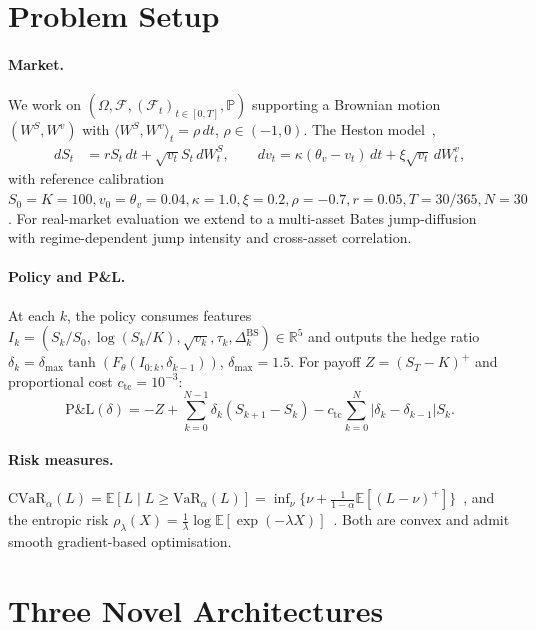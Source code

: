 \documentclass[11pt]{article}
\newcommand{\cvar}{\mathrm{CVaR}}
\newcommand{\E}{\mathbb{E}}
\newcommand{\PP}{\mathbb{P}}
\newcommand{\R}{\mathbb{R}}
\begin{document}
\section{Problem Setup}\label{sec:setup}

\paragraph{Market.}  We work on $(\Omega,\mathcal{F},(\mathcal{F}_t)_{t\in[0,T]},\PP)$ supporting a Brownian motion $(W^S, W^v)$ with $\langle W^S, W^v\rangle_t = \rho\,dt$, $\rho\in(-1,0)$.  The Heston model~\citep{heston1993closed},
\begin{align}
dS_t &= rS_t\,dt + \sqrt{v_t}S_t\,dW_t^S, \qquad
dv_t = \kappa(\theta_v - v_t)\,dt + \xi\sqrt{v_t}\,dW_t^v,
\end{align}
with reference calibration $S_0=K=100, v_0=\theta_v=0.04, \kappa=1.0, \xi=0.2, \rho=-0.7, r=0.05, T=30/365, N=30$.  For real-market evaluation we extend to a multi-asset Bates jump-diffusion~\citep{bates1996jumps} with regime-dependent jump intensity and cross-asset correlation.

\paragraph{Policy and P\&L.}
At each $k$, the policy consumes features $I_k=(S_k/S_0,\log(S_k/K),\sqrt{v_k},\tau_k,\Delta_k^{\mathrm{BS}})\in\R^5$ and outputs the hedge ratio $\delta_k=\delta_{\max}\tanh(F_\theta(I_{0:k},\delta_{k-1}))$, $\delta_{\max}=1.5$.  For payoff $Z=(S_T-K)^+$ and proportional cost $c_{\mathrm{tc}}=10^{-3}$:
\begin{equation}
\mathrm{P\&L}(\delta) = -Z + \sum_{k=0}^{N-1}\delta_k(S_{k+1}-S_k) - c_{\mathrm{tc}}\sum_{k=0}^{N}|\delta_k - \delta_{k-1}|S_k.
\label{eq:pnl}
\end{equation}

\paragraph{Risk measures.}
$\cvar_\alpha(L) = \E[L\mid L\ge \mathrm{VaR}_\alpha(L)] = \inf_{\nu}\{\nu+\frac{1}{1-\alpha}\E[(L-\nu)^+]\}$~\citep{rockafellar2000optimization}, and the entropic risk $\rho_\lambda(X)=\frac{1}{\lambda}\log\E[\exp(-\lambda X)]$~\citep{follmer2002convex}.  Both are convex and admit smooth gradient-based optimisation.

\section{Three Novel Architectures}\label{sec:methods}
\end{document}
